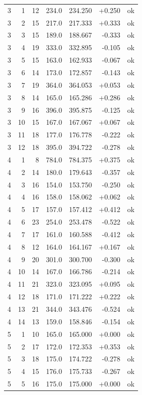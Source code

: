 \begin{longtable}{rrrrrrl}
3 & 1 & 12 & 234.0 & 234.250 & +0.250 & ok \\
3 & 2 & 15 & 217.0 & 217.333 & +0.333 & ok \\
3 & 3 & 15 & 189.0 & 188.667 & -0.333 & ok \\
3 & 4 & 19 & 333.0 & 332.895 & -0.105 & ok \\
3 & 5 & 15 & 163.0 & 162.933 & -0.067 & ok \\
3 & 6 & 14 & 173.0 & 172.857 & -0.143 & ok \\
3 & 7 & 19 & 364.0 & 364.053 & +0.053 & ok \\
3 & 8 & 14 & 165.0 & 165.286 & +0.286 & ok \\
3 & 9 & 16 & 396.0 & 395.875 & -0.125 & ok \\
3 & 10 & 15 & 167.0 & 167.067 & +0.067 & ok \\
3 & 11 & 18 & 177.0 & 176.778 & -0.222 & ok \\
3 & 12 & 18 & 395.0 & 394.722 & -0.278 & ok \\
4 & 1 & 8 & 784.0 & 784.375 & +0.375 & ok \\
4 & 2 & 14 & 180.0 & 179.643 & -0.357 & ok \\
4 & 3 & 16 & 154.0 & 153.750 & -0.250 & ok \\
4 & 4 & 16 & 158.0 & 158.062 & +0.062 & ok \\
4 & 5 & 17 & 157.0 & 157.412 & +0.412 & ok \\
4 & 6 & 23 & 254.0 & 253.478 & -0.522 & ok \\
4 & 7 & 17 & 161.0 & 160.588 & -0.412 & ok \\
4 & 8 & 12 & 164.0 & 164.167 & +0.167 & ok \\
4 & 9 & 20 & 301.0 & 300.700 & -0.300 & ok \\
4 & 10 & 14 & 167.0 & 166.786 & -0.214 & ok \\
4 & 11 & 21 & 323.0 & 323.095 & +0.095 & ok \\
4 & 12 & 18 & 171.0 & 171.222 & +0.222 & ok \\
4 & 13 & 21 & 344.0 & 343.476 & -0.524 & ok \\
4 & 14 & 13 & 159.0 & 158.846 & -0.154 & ok \\
5 & 1 & 10 & 165.0 & 165.000 & +0.000 & ok \\
5 & 2 & 17 & 172.0 & 172.353 & +0.353 & ok \\
5 & 3 & 18 & 175.0 & 174.722 & -0.278 & ok \\
5 & 4 & 15 & 176.0 & 175.733 & -0.267 & ok \\
5 & 5 & 16 & 175.0 & 175.000 & +0.000 & ok \\

\end{longtable}
